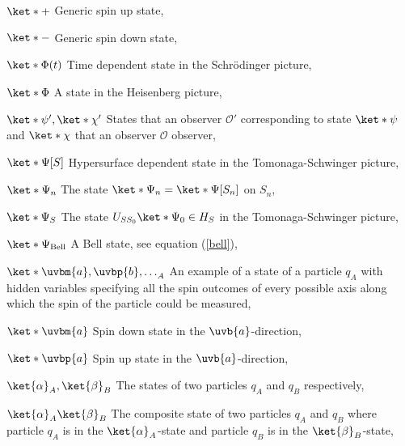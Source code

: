 \begin{thenomenclature}
  \item [{$\ket*{+}$}]\begingroup Generic spin up state, \nomrefpage{}
  \item [{$\ket*{-}$}]\begingroup Generic spin down state, \nomrefpage{}
  \item [{$\ket*{\Phi(t)}$}]\begingroup Time dependent state in the Schr\"{o}dinger picture, \nomrefpage{}
  \item [{$\ket*{\Phi}$}]\begingroup A state in the Heisenberg picture, \nomrefpage{}
  \item [{$\ket*{\psi'}, \ket*{\chi'}$}]\begingroup States that an observer $\mathcal{O}'$ corresponding to state $\ket*{\psi}$ and $\ket*{\chi}$ that an observer $\mathcal{O}$ observer, \nomrefpage{}
  \item [{$\ket*{\Psi[S]}$}]\begingroup Hypersurface dependent state in the Tomonaga-Schwinger picture, \nomrefpage{}
  \item [{$\ket*{\Psi_n}$}]\begingroup The state $\ket*{\Psi_n}=\ket*{\Psi[S_n]}$ on $S_n$, \nomrefpage{}
  \item [{$\ket*{\Psi_S}$}]\begingroup The state $U_{SS_0}\ket*{\Psi_0}\in H_S$ in the Tomonaga-Schwinger picture, \nomrefpage{}
  \item [{$\ket*{\Psi_{\text{Bell}}}$}]\begingroup A Bell state, see equation (\ref{bell}), \nomrefpage{}
  \item [{$\ket*{\uvbm{a},\uvbp{b},\ldots}_A$}]\begingroup An example of a state of a particle $q_A$ with hidden variables specifying all the spin outcomes of every possible axis along which the spin of the particle could be measured, \nomrefpage{}
  \item [{$\ket*{\uvbm{a}}$}]\begingroup Spin down state in the $\uvb{a}$-direction, \nomrefpage{}
  \item [{$\ket*{\uvbp{a}}$}]\begingroup Spin up state in the $\uvb{a}$-direction, \nomrefpage{}
  \item [{$\ket{\alpha}_A, \ket{\beta}_B$}]\begingroup The states of two particles $q_A$ and $q_B$ respectively, \nomrefpage{}
  \item [{$\ket{\alpha}_A\ket{\beta}_B$}]\begingroup The composite state of two particles $q_A$ and $q_B$ where particle $q_A$ is in the $\ket{\alpha}_A$-state and particle $q_B$ is in the $\ket{\beta}_B$-state, \nomrefpage{}

\end{thenomenclature}
